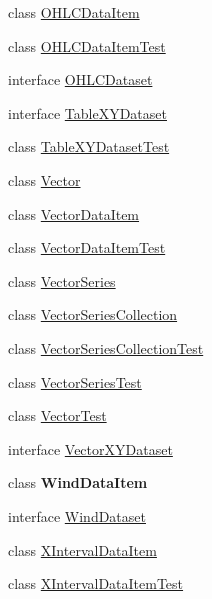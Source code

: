 \begin{DoxyCompactItemize}
class \mbox{\hyperlink{classorg_1_1jfree_1_1data_1_1xy_1_1_o_h_l_c_data_item}{O\+H\+L\+C\+Data\+Item}}
\item 
class \mbox{\hyperlink{classorg_1_1jfree_1_1data_1_1xy_1_1_o_h_l_c_data_item_test}{O\+H\+L\+C\+Data\+Item\+Test}}
\item 
interface \mbox{\hyperlink{interfaceorg_1_1jfree_1_1data_1_1xy_1_1_o_h_l_c_dataset}{O\+H\+L\+C\+Dataset}}
\item 
interface \mbox{\hyperlink{interfaceorg_1_1jfree_1_1data_1_1xy_1_1_table_x_y_dataset}{Table\+X\+Y\+Dataset}}
\item 
class \mbox{\hyperlink{classorg_1_1jfree_1_1data_1_1xy_1_1_table_x_y_dataset_test}{Table\+X\+Y\+Dataset\+Test}}
\item 
class \mbox{\hyperlink{classorg_1_1jfree_1_1data_1_1xy_1_1_vector}{Vector}}
\item 
class \mbox{\hyperlink{classorg_1_1jfree_1_1data_1_1xy_1_1_vector_data_item}{Vector\+Data\+Item}}
\item 
class \mbox{\hyperlink{classorg_1_1jfree_1_1data_1_1xy_1_1_vector_data_item_test}{Vector\+Data\+Item\+Test}}
\item 
class \mbox{\hyperlink{classorg_1_1jfree_1_1data_1_1xy_1_1_vector_series}{Vector\+Series}}
\item 
class \mbox{\hyperlink{classorg_1_1jfree_1_1data_1_1xy_1_1_vector_series_collection}{Vector\+Series\+Collection}}
\item 
class \mbox{\hyperlink{classorg_1_1jfree_1_1data_1_1xy_1_1_vector_series_collection_test}{Vector\+Series\+Collection\+Test}}
\item 
class \mbox{\hyperlink{classorg_1_1jfree_1_1data_1_1xy_1_1_vector_series_test}{Vector\+Series\+Test}}
\item 
class \mbox{\hyperlink{classorg_1_1jfree_1_1data_1_1xy_1_1_vector_test}{Vector\+Test}}
\item 
interface \mbox{\hyperlink{interfaceorg_1_1jfree_1_1data_1_1xy_1_1_vector_x_y_dataset}{Vector\+X\+Y\+Dataset}}
\item 
class {\bfseries Wind\+Data\+Item}
\item 
interface \mbox{\hyperlink{interfaceorg_1_1jfree_1_1data_1_1xy_1_1_wind_dataset}{Wind\+Dataset}}
\item 
class \mbox{\hyperlink{classorg_1_1jfree_1_1data_1_1xy_1_1_x_interval_data_item}{X\+Interval\+Data\+Item}}
\item 
class \mbox{\hyperlink{classorg_1_1jfree_1_1data_1_1xy_1_1_x_interval_data_item_test}{X\+Interval\+Data\+Item\+Test}}

\end{DoxyCompactItemize}

